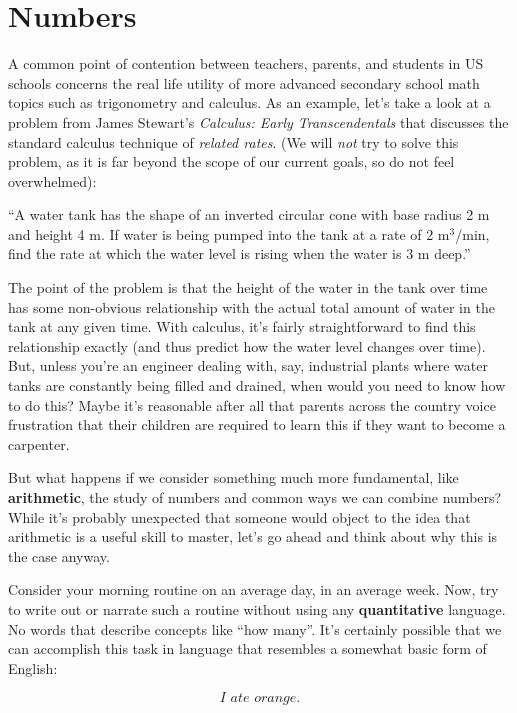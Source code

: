\chapter{Numbers}

A common point of contention between teachers, parents, and students in US
schools concerns the real life utility of more advanced secondary school math
topics such as trigonometry and calculus. As an example, let's take a look at
a problem from James Stewart's \textit{Calculus: Early Transcendentals} that
discusses the standard calculus technique of \textit{related rates}. (We will
\textit{not} try to solve this problem, as it is far beyond the scope of our
current goals, so do not feel overwhelmed):

``A water tank has the shape of an inverted circular cone with base radius 2 m
and height 4 m. If water is being pumped into the tank at a rate of 2 m$^3$/min,
find the rate at which the water level is rising when the water is 3 m deep.''

The point of the problem is that the height of the water in the tank over time
has some non-obvious relationship with the actual total amount of water in the
tank at any given time. With calculus, it's fairly straightforward to find this
relationship exactly (and thus predict how the water level changes over time).
But, unless you're an engineer dealing with, say, industrial plants where water
tanks are constantly being filled and drained, when would you need to know how
to do this? Maybe it's reasonable after all that parents across the country
voice frustration that their children are required to learn this if they want
to become a carpenter.

But what happens if we consider something much more fundamental, like
\textbf{arithmetic}, the study of numbers and common ways we can combine numbers?
While it's probably unexpected that someone would object to the idea that
arithmetic is a useful skill to master, let's go ahead and think about why this
is the case anyway.

Consider your morning routine on an average day, in an average week.
Now, try to write out or narrate such a routine without using any
\textbf{quantitative} language. No words that describe concepts like ``how many''.
It's certainly possible that we can accomplish this task in language that
resembles a somewhat basic form of English:

\[
    \textit{I ate orange.}
\]

